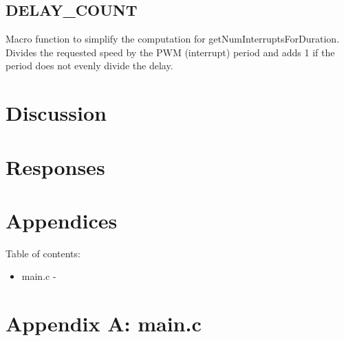 \documentclass[letterpaper,11pt]{texMemo} %
\begin{document}
\subsection*{DELAY\_COUNT}
Macro function to simplify the computation for getNumInterruptsForDuration. Divides the requested speed by the PWM (interrupt) period and adds 1 if the period does not evenly divide the delay.

\section*{Discussion}


\section*{Responses}
\begin{enumerate}

\end{enumerate} 

\newpage
\section*{Appendices}
Table of contents:
\begin{itemize}
    \item main.c - %
\end{itemize}
\newpage

\section*{Appendix A: main.c}
\begin{tiny}

\end{tiny}
\newpage
\end{document}
